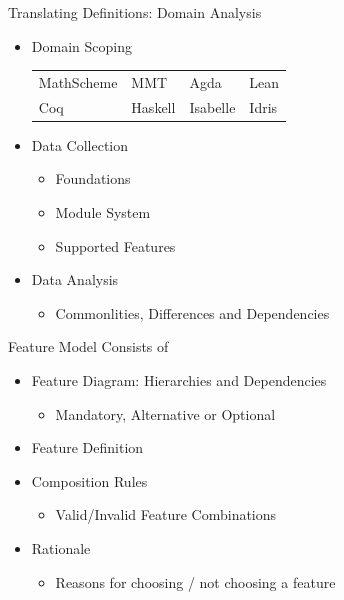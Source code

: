 \documentclass[t,12pt,numbers,fleqn,usenames,xcolor=dvipsnames]{beamer}
\begin{document}
\begin{frame}[fragile]{Translating Definitions: Domain Analysis}
\begin{itemize}
	\item Domain Scoping 
\scriptsize{	
	\begin{tabular}{ p{1cm} p{1cm} p{1cm} p{1cm}}
		MathScheme & MMT & Agda & Lean \\ [1ex]
		Coq & Haskell &  Isabelle & Idris 
	\end{tabular}}
\pause
\normalsize
	\item Data Collection 
	\begin{itemize}
		\item Foundations 
		\item Module System 
		\item Supported Features 
	\end{itemize}
\pause
	\item Data Analysis 
	\begin{itemize}
		\item Commonlities, Differences and Dependencies 
	\end{itemize}
\end{itemize}
\pause
{}
\end{frame}

\begin{frame}[fragile]{Feature Model}
Consists of 
\begin{itemize}
	\item Feature Diagram: Hierarchies and Dependencies
	\begin{itemize}
		\item Mandatory, Alternative or Optional 
	\end{itemize}
\pause
	\item Feature Definition
\pause
	\item Composition Rules
	\begin{itemize}
		\item Valid/Invalid Feature Combinations 
	\end{itemize}
\pause
	\item Rationale
	\begin{itemize}
		\item Reasons for choosing / not choosing a feature
	\end{itemize} 
\end{itemize}
\end{frame}
\end{document}
